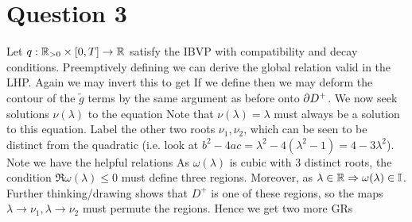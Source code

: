 \documentclass{article}
\begin{document}
\section{Question 3}
Let $q:\mathbb{R}_{>0} \times [0,T] \to \mathbb{R}$ satisfy the IBVP 
with compatibility and decay conditions. Preemptively defining 
we can derive the global relation 
valid in the LHP. Again we may invert this to get 
If we define 
then we may deform the contour of the $\tilde{g}$ terms by the same argument as before onto $\partial D^+$. We now seek solutions $\nu(\lambda)$ to the equation 
Note that $\nu(\lambda) = \lambda$ must always be a solution to this equation. Label the other two roots $\nu_1, \nu_2$, which can be seen to be distinct from the quadratic (i.e. look at $b^2 - 4ac = \lambda^2 - 4(\lambda^2-1) = 4-3\lambda^2$). Note we have the helpful relations 
As $\omega(\lambda)$ is cubic with 3 distinct roots, the condition $\Re\omega(\lambda) \leq 0$ must define three regions. Moreover, as $\lambda \in \mathbb{R} \Rightarrow \omega(\lambda) \in \mathbb{I}$. Further thinking/drawing shows that $D^+$ is one of these regions, so the maps $\lambda \to \nu_1, \lambda \to \nu_2$ must permute the regions. Hence we get two more GRs 
\end{document}
